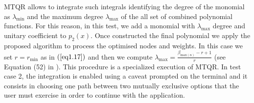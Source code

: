 \documentclass[a4paper, twosided]{book}
\begin{document}
\newline
MTQR allows to integrate such integrals identifying the degree of the monomial as $\lambda_{\text{min}}$ and the maximum degree  $\lambda_{\text{max}}$ of the all set of combined polynomial functions. For this reason, in this test, we add a monomial with $\lambda_{\text{max}}$ degree and unitary coefficient to $p_2(x)$. Once constructed the final polynomial we apply the proposed algorithm to process the optimised nodes and weights. In this case we set $r=r_{\text{min}}$ as in $(\ref{eq1.17})$ and then we compute $\lambda_{\text{max}} = \frac{\beta_{\text{max}(n)} -r+1}{r}$ (see Equation (52) in \cite{Lombardi09}). This procedure is a specialized execution of MTQR.
\newline
In test case 2, the integration is enabled using a caveat prompted on the terminal and it consists in choosing one path between two mutually exclusive options that the user must exercise in order to continue with the application.
\end{document}
